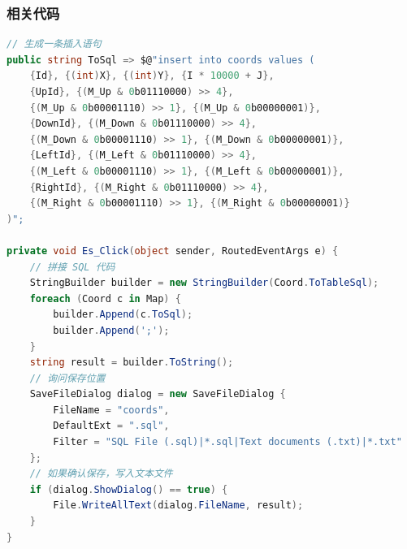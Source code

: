 \subsubsection{相关代码}

\begin{lstlisting}[language=cs]
// 生成一条插入语句
public string ToSql => $@"insert into coords values (
    {Id}, {(int)X}, {(int)Y}, {I * 10000 + J},
    {UpId}, {(M_Up & 0b01110000) >> 4},
    {(M_Up & 0b00001110) >> 1}, {(M_Up & 0b00000001)},
    {DownId}, {(M_Down & 0b01110000) >> 4},
    {(M_Down & 0b00001110) >> 1}, {(M_Down & 0b00000001)},
    {LeftId}, {(M_Left & 0b01110000) >> 4},
    {(M_Left & 0b00001110) >> 1}, {(M_Left & 0b00000001)},
    {RightId}, {(M_Right & 0b01110000) >> 4},
    {(M_Right & 0b00001110) >> 1}, {(M_Right & 0b00000001)}
)";

private void Es_Click(object sender, RoutedEventArgs e) {
    // 拼接 SQL 代码
    StringBuilder builder = new StringBuilder(Coord.ToTableSql);
    foreach (Coord c in Map) {
        builder.Append(c.ToSql);
        builder.Append(';');
    }
    string result = builder.ToString();
    // 询问保存位置
    SaveFileDialog dialog = new SaveFileDialog {
        FileName = "coords",
        DefaultExt = ".sql",
        Filter = "SQL File (.sql)|*.sql|Text documents (.txt)|*.txt"
    };
    // 如果确认保存，写入文本文件
    if (dialog.ShowDialog() == true) {
        File.WriteAllText(dialog.FileName, result);
    }
}
\end{lstlisting}
